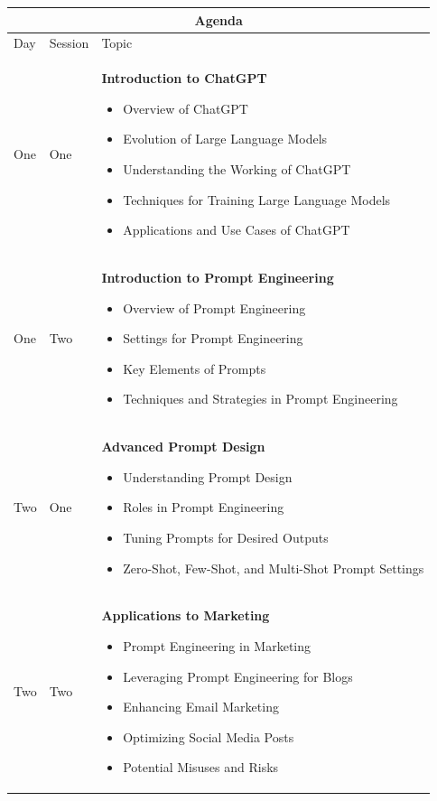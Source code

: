 \documentclass[a4paper, 11pt]{article}
\begin{document}
\begin{center} 
\begin{tabular}{ |p{1cm}|p{1cm}||p{10cm}|  }
 \hline
 \multicolumn{3}{|c|}{\textbf{\large Agenda}} \\
 \hline
Day & Session & Topic\\
 \hline
 One   &  One    &  \textbf{Introduction to ChatGPT}
\begin{itemize}[itemsep=0pt]
\item Overview of ChatGPT
\item Evolution of Large Language Models
\item Understanding the Working of ChatGPT
\item Techniques for Training Large Language Models
\item Applications and Use Cases of ChatGPT
\end{itemize} 
\\
One &   Two  &   \textbf{Introduction to Prompt Engineering}
 \begin{itemize}[itemsep=0pt]
\item Overview of Prompt Engineering
\item Settings for Prompt Engineering
\item Key Elements of Prompts
\item Techniques and Strategies in Prompt Engineering
\end{itemize} 
\\
Two   &  One    & \textbf{Advanced Prompt Design}
 \begin{itemize}[itemsep=0pt]
\item Understanding Prompt Design
\item Roles in Prompt Engineering
\item Tuning Prompts for Desired Outputs
\item Zero-Shot, Few-Shot, and Multi-Shot Prompt Settings
\end{itemize} 
\\
Two  &   Two  & \textbf{Applications to Marketing}
 \begin{itemize}[itemsep=0pt]
\item Prompt Engineering in Marketing
\item Leveraging Prompt Engineering for Blogs
\item Enhancing Email Marketing
\item Optimizing Social Media Posts 
\item Potential Misuses and Risks 
\end{itemize} 
\\
 \hline
\end{tabular}
\end{center}
\end{document}
